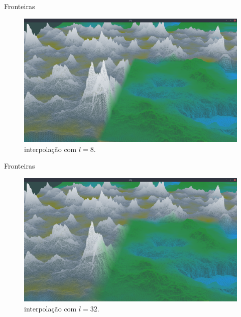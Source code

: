 \begin{frame}{Fronteiras}
    \begin{figure}[H]
        \centering
        \includegraphics[width=.9\textwidth]{img/borders/8lm.png}
        \caption{interpolação com $l = 8$.}
        \label{fig:img_borders_8lm}
    \end{figure}
    
\end{frame}

\begin{frame}{Fronteiras}
    \begin{figure}[H]
        \centering
        \includegraphics[width=.9\textwidth]{img/borders/32lm.png}
        \caption{interpolação com $l = 32$.}
        \label{fig:img_borders_32lm}
    \end{figure}
    
\end{frame}

